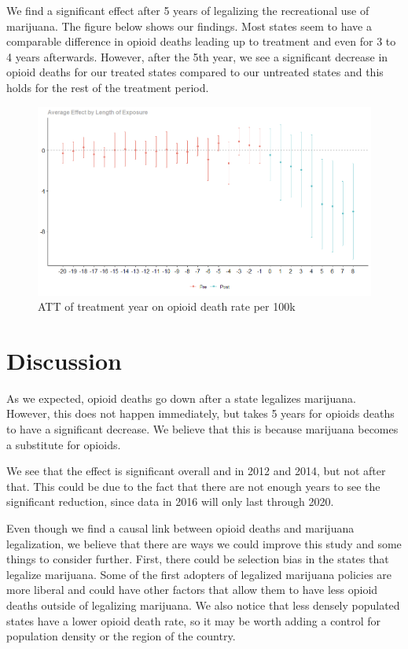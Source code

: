 \documentclass{article}
\begin{document}


We find a significant effect after 5 years of legalizing the recreational use of marijuana. The figure below shows our findings. Most states seem to have a comparable difference in opioid deaths leading up to treatment and even for 3 to 4 years afterwards. However, after the 5th year, we see a significant decrease in opioid deaths for our treated states compared to our untreated states and this holds for the rest of the treatment period. 


\begin{figure}
    \begin{center}
        \includegraphics[width=.85\textwidth]{sc_graph.png}
    \end{center}
    \caption{ATT of treatment year on opioid death rate per 100k}
    \label{fig:graph}
\end{figure}





\section*{Discussion}

As we expected, opioid deaths go down after a state legalizes marijuana. However, this does not happen immediately, but takes 5 years for opioids deaths to have a significant decrease. We believe that this is because marijuana becomes a substitute for opioids. 

We see that the effect is significant overall and in 2012 and 2014, but not after that. This could be due to the fact that there are not enough years to see the significant reduction, since data in 2016 will only last through 2020. 

Even though we find a causal link between opioid deaths and marijuana legalization, we believe that there are ways we could improve this study and some things to consider further. First, there could be selection bias in the states that legalize marijuana. Some of the first adopters of legalized marijuana policies are more liberal and could have other factors that allow them to have less opioid deaths outside of legalizing marijuana. We also notice that less densely populated states have a lower opioid death rate, so it may be worth adding a control for population density or the region of the country.
\end{document}
